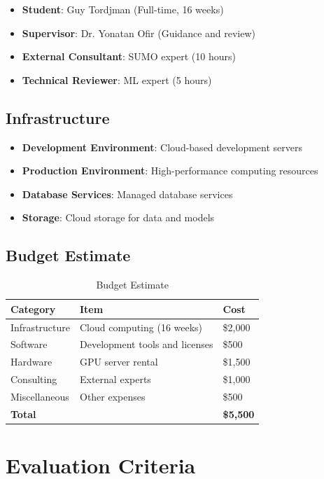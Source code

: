 \documentclass[12pt,a4paper]{article}
\begin{document}
\begin{itemize}
    \item \textbf{Student}: Guy Tordjman (Full-time, 16 weeks)
    \item \textbf{Supervisor}: Dr. Yonatan Ofir (Guidance and review)
    \item \textbf{External Consultant}: SUMO expert (10 hours)
    \item \textbf{Technical Reviewer}: ML expert (5 hours)
\end{itemize}

\subsection{Infrastructure}

\begin{itemize}
    \item \textbf{Development Environment}: Cloud-based development servers
    \item \textbf{Production Environment}: High-performance computing resources
    \item \textbf{Database Services}: Managed database services
    \item \textbf{Storage}: Cloud storage for data and models
\end{itemize}

\subsection{Budget Estimate}

\begin{table}[h]
\centering
\begin{tabular}{|l|l|l|}
\hline
\textbf{Category} & \textbf{Item} & \textbf{Cost} \\
\hline
Infrastructure & Cloud computing (16 weeks) & \$2,000 \\
Software & Development tools and licenses & \$500 \\
Hardware & GPU server rental & \$1,500 \\
Consulting & External experts & \$1,000 \\
Miscellaneous & Other expenses & \$500 \\
\hline
\textbf{Total} & & \textbf{\$5,500} \\
\hline
\end{tabular}
\caption{Budget Estimate}
\label{tab:budget}
\end{table}

\section{Evaluation Criteria}
\end{document}
